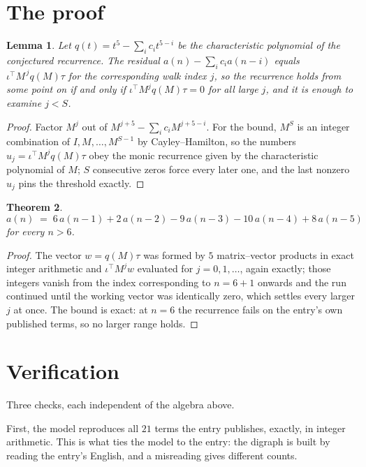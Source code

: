 \documentclass[11pt,a4paper]{article}
\theoremstyle{plain}
\newtheorem{theorem}{Theorem}
\newtheorem{lemma}[theorem]{Lemma}
\theoremstyle{definition}
\begin{document}
\section{The proof}

\begin{lemma}\label{lem:crit}
Let $q(t)=t^{5}-\sum_i c_it^{5-i}$ be the characteristic polynomial of the
conjectured recurrence. The residual $a(n)-\sum_ic_ia(n-i)$ equals
$\iota^{\!\top}M^{\,j}q(M)\tau$ for the corresponding walk index $j$, so the recurrence
holds from some point on if and only if $\iota^{\!\top}M^{j}q(M)\tau=0$ for all large $j$,
and it is enough to examine $j<S$.
\end{lemma}

\begin{proof}
Factor $M^{j}$ out of $M^{j+5}-\sum_ic_iM^{j+5-i}$. For the bound, $M^{S}$
is an integer combination of $I,M,\dots,M^{S-1}$ by Cayley--Hamilton, so the numbers
$u_j=\iota^{\!\top}M^{j}q(M)\tau$ obey the monic recurrence given by the characteristic
polynomial of $M$; $S$ consecutive zeros force every later one, and the last nonzero $u_j$
pins the threshold exactly.
\end{proof}

\begin{theorem}
\[
a(n)\;=\;6\,a(n-1) + 2\,a(n-2) - 9\,a(n-3) - 10\,a(n-4) + 8\,a(n-5)
\]
for every $n>6$.
\end{theorem}

\begin{proof}
The vector $w=q(M)\tau$ was formed by $5$ matrix--vector products in exact integer
arithmetic and $\iota^{\!\top}M^{j}w$ evaluated for $j=0,1,\dots$, again exactly; those
integers vanish from the index corresponding to $n=6+1$ onwards and the run continued
until the working vector was identically zero, which settles every larger $j$ at once. The bound is exact: at $n=6$ the recurrence fails on the entry's own published terms, so no larger range holds.
\end{proof}

\section{Verification}

Three checks, each independent of the algebra above.

First, the model reproduces all $21$ terms the entry publishes, exactly, in integer
arithmetic. This is what ties the model to the entry: the digraph is built by reading the
entry's English, and a misreading gives different counts.
\end{document}
